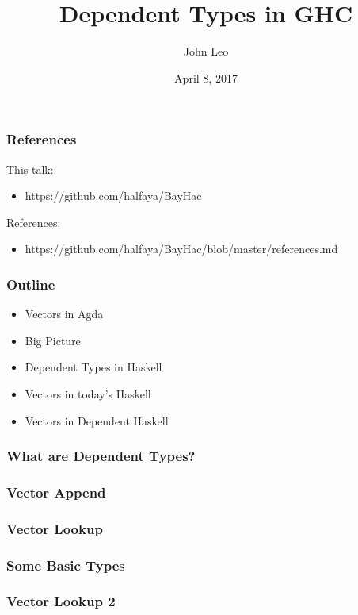 \documentclass{beamer}
\title{Dependent Types in GHC}
\author{John Leo}
\institute{Halfaya Research}
\date{April 8, 2017}
\begin{document}
 
\frame{\titlepage}
 
\begin{frame}\frametitle{References}
This talk:
\begin{itemize}
\item https://github.com/halfaya/BayHac
\end{itemize}
References:
\begin{itemize}
\item https://github.com/halfaya/BayHac/blob/master/references.md
\end{itemize}
\end{frame}

\begin{frame}\frametitle{Outline}
\begin{itemize}
\item Vectors in Agda
\item Big Picture
\item Dependent Types in Haskell
\item Vectors in today's Haskell
\item Vectors in Dependent Haskell
\end{itemize}
\end{frame}

\begin{frame}\frametitle{What are Dependent Types?}
\end{frame}

\begin{frame}\frametitle{Vector Append}
\end{frame}

\begin{frame}\frametitle{Vector Lookup}
\end{frame}

\begin{frame}\frametitle{Some Basic Types}
\end{frame}

\begin{frame}\frametitle{Vector Lookup 2}
\end{frame}
\end{document}
